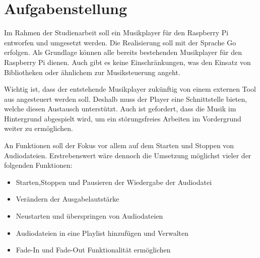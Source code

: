 
\chapter{Aufgabenstellung}

Im Rahmen der Studienarbeit soll ein Musikplayer für den Raspberry Pi entworfen
und umgesetzt werden. Die Realisierung soll mit der Sprache Go erfolgen. Als
Grundlage können alle bereits bestehenden Musikplayer für den Raspberry Pi
dienen. Auch gibt es keine Einschränkungen, was den Einsatz von Bibliotheken
oder ähnlichem zur Musiksteuerung angeht. \hfill \break

Wichtig ist, dass der entstehende Musikplayer zukünftig von einem externen Tool aus
angesteuert werden soll. Deshalb muss der Player eine Schnittstelle bieten,
welche diesen Austausch unterstützt. Auch ist gefordert, dass die Musik im
Hintergrund abgespielt wird, um ein störungsfreies Arbeiten im Vordergrund
weiter zu ermöglichen. \hfill \break

An Funktionen soll der Fokus vor allem auf dem Starten und Stoppen von
Audiodateien. Erstrebenswert wäre dennoch die Umsetzung möglichst vieler der
folgenden Funktionen: 

\begin{itemize}
\item Starten,Stoppen und Pausieren der Wiedergabe der Audiodatei
\item Verändern der Ausgabelautstärke
\item Neustarten und überspringen von Audiodateien
\item Audiodateien in eine Playlist hinzufügen und Verwalten
\item Fade-In und Fade-Out Funktionalität ermöglichen
\end{itemize}

